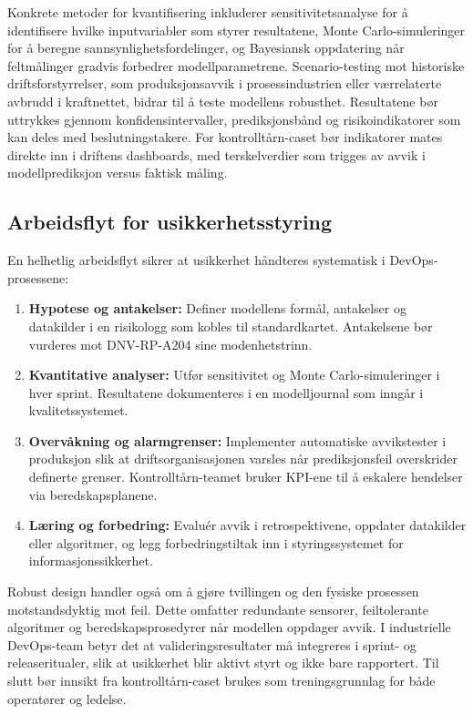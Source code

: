 Konkrete metoder for kvantifisering inkluderer sensitivitetsanalyse for å identifisere hvilke inputvariabler som styrer resultatene, Monte Carlo-simuleringer for å beregne sannsynlighetsfordelinger, og Bayesiansk oppdatering når feltmålinger gradvis forbedrer modellparametrene. Scenario-testing mot historiske driftsforstyrrelser, som produksjonsavvik i prosessindustrien eller værrelaterte avbrudd i kraftnettet, bidrar til å teste modellens robusthet. Resultatene bør uttrykkes gjennom konfidensintervaller, prediksjonsbånd og risikoindikatorer som kan deles med beslutningstakere. For kontrolltårn-caset bør indikatorer mates direkte inn i driftens dashboards, med terskelverdier som trigges av avvik i modellprediksjon versus faktisk måling.

\subsection{Arbeidsflyt for usikkerhetsstyring}
En helhetlig arbeidsflyt sikrer at usikkerhet håndteres systematisk i DevOps-prosessene:
\begin{enumerate}
    \item \textbf{Hypotese og antakelser:} Definer modellens formål, antakelser og datakilder i en risikologg som kobles til standardkartet. Antakelsene bør vurderes mot DNV-RP-A204 sine modenhetstrinn.
    \item \textbf{Kvantitative analyser:} Utfør sensitivitet og Monte Carlo-simuleringer i hver sprint. Resultatene dokumenteres i en modelljournal som inngår i kvalitetssystemet.
    \item \textbf{Overvåkning og alarmgrenser:} Implementer automatiske avvikstester i produksjon slik at driftsorganisasjonen varsles når prediksjonsfeil overskrider definerte grenser. Kontrolltårn-teamet bruker KPI-ene til å eskalere hendelser via beredskapsplanene.
    \item \textbf{Læring og forbedring:} Evaluér avvik i retrospektivene, oppdater datakilder eller algoritmer, og legg forbedringstiltak inn i styringssystemet for informasjonssikkerhet.
\end{enumerate}

Robust design handler også om å gjøre tvillingen og den fysiske prosessen motstandsdyktig mot feil. Dette omfatter redundante sensorer, feiltolerante algoritmer og beredskapsprosedyrer når modellen oppdager avvik. I industrielle DevOps-team betyr det at valideringsresultater må integreres i sprint- og releaseritualer, slik at usikkerhet blir aktivt styrt og ikke bare rapportert. Til slutt bør innsikt fra kontrolltårn-caset brukes som treningsgrunnlag for både operatører og ledelse.

